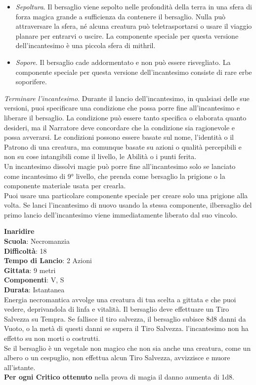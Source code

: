 \begin{multicols}{2}
\begin{itemize}
\item
\textit{Sepoltura}. Il bersaglio viene sepolto nelle profondità della terra in una sfera di forza magica grande a sufficienza da contenere il bersaglio. Nulla può attraversare la sfera, né alcuna creatura può teletrasportarsi o usare il viaggio planare per entrarvi o uscire. La componente speciale per questa versione dell'incantesimo è una piccola sfera di mithril. 
\item
\textit{Sopore}. Il bersaglio cade addormentato e non può essere risvegliato. La componente speciale per questa versione dell'incantesimo consiste di rare erbe soporifere.
\end{itemize}
\medskip
\textit{Terminare l'incantesimo}. Durante il lancio dell'incantesimo, in qualsiasi delle sue versioni, puoi specificare una condizione che possa porre fine all'incantesimo e liberare il bersaglio. La condizione può essere tanto specifica o elaborata quanto desideri, ma il Narratore deve concordare che la condizione sia ragionevole e possa avverarsi. Le condizioni possono essere basate sul nome, l’identità o il Patrono di una creatura, ma comunque basate su azioni o qualità percepibili e non su cose intangibili come il livello, le Abilità o i punti ferita.\\
Un incantesimo dissolvi magie può porre fine all'incantesimo solo se lanciato come incantesimo di 9° livello, che prenda come bersaglio la prigione o la componente materiale usata per crearla.\\
Puoi usare una particolare componente speciale per creare solo una prigione alla volta. Se lanci l'incantesimo di nuovo usando la stessa componente, ilbersaglio del primo lancio dell'incantesimo  viene immediatamente liberato dal suo vincolo.

\medskip\textbf{Inaridire}\\
\textbf{Scuola}: Necromanzia\\
\textbf{Difficoltà}:  18\\
\textbf{Tempo di Lancio}: 2 Azioni\\
\textbf{Gittata}: 9 metri\\
\textbf{Componenti}: V, S\\
\textbf{Durata}: Istantanea\\
Energia necromantica avvolge una creatura di tua scelta a gittata e che puoi vedere, deprivandola di linfa e vitalità. Il bersaglio deve effettuare un Tiro Salvezza su Tempra. Se fallisce il tiro  salvezza, il bersaglio subisce 8d8 danni da Vuoto, o la metà di questi danni se supera il Tiro Salvezza. l'incantesimo non ha effetto su non morti o costrutti.\\
Se il bersaglio è un vegetale non magico che non sia anche una creatura, come un albero o un cespuglio, non effettua alcun Tiro Salvezza, avvizzisce e muore all'istante.\\
\textbf{Per ogni Critico ottenuto} nella prova di magia il danno aumenta di 1d8.


\end{multicols}
